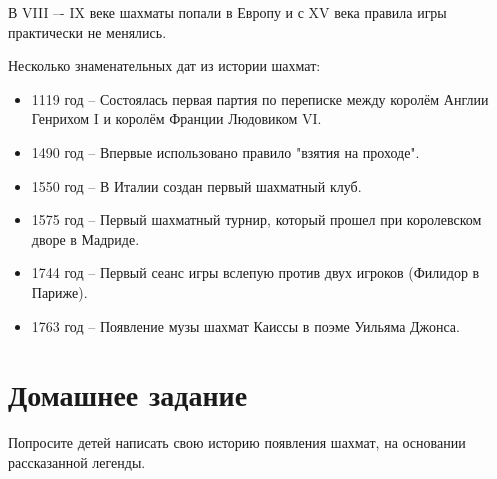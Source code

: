 В VIII –- IX веке шахматы попали в Европу и с XV века правила игры практически не менялись.

Несколько знаменательных дат из истории шахмат:
\begin{itemize}
\item 1119 год -- Состоялась первая партия по переписке между королём Англии Генрихом I и королём Франции Людовиком VI. 
\item 1490 год -- Впервые использовано правило "взятия на проходе". 
\item 1550 год -- В Италии создан первый шахматный клуб. 
\item 1575 год -- Первый шахматный турнир, который прошел при королевском дворе в Мадриде. 
\item 1744 год -- Первый сеанс игры вслепую против двух игроков (Филидор в Париже).
\item 1763 год -- Появление музы шахмат Каиссы в поэме Уильяма Джонса.
\end{itemize}
 
\section{Домашнее задание}

Попросите детей написать свою историю появления шахмат, на основании рассказанной легенды.
